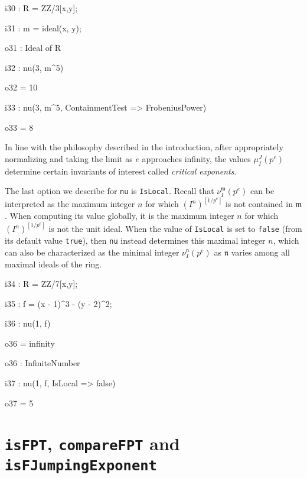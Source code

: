 \documentclass{amsart}
\newcommand{\idealm}{\mathfrak{m}}
\begin{document}
\bigskip
{\small
{}
\begin{MyVerbatim}
i30 : R = ZZ/3[x,y];

i31 : m = ideal(x, y);

o31 : Ideal of R

i32 : nu(3, m^5)

o32 = 10

i33 : nu(3, m^5, ContainmentTest => FrobeniusPower)

o33 = 8
\end{MyVerbatim}
}
\bigskip

 In line with the philosophy described in the introduction, after appropriately normalizing and taking the limit as $e$ approaches infinity, the values $\mu_I^J(p^e)$ determine certain invariants of interest called \emph{critical exponents}.

The last option we describe for \texttt{nu} is \texttt{IsLocal}.
Recall that $\nu_I^\idealm(p^e)$ can be interpreted as the maximum integer $n$ for which $(I^n)^{[1/p^e]}$ is not contained in $\idealm$. 
When computing its value globally, it is the maximum integer $n$ for which $(I^n)^{[1/p^e]}$ is not the unit ideal.  When 
the value of \texttt{IsLocal} is set to \texttt{false} (from its default value \texttt{true}), then \texttt{nu} instead determines this maximal integer $n$, which can also be characterized as the minimal integer $\nu_I^\mathfrak{n}(p^e)$ as $\mathfrak{n}$ varies among all maximal ideals of the ring.  

%

\bigskip
{\small
{}
\begin{MyVerbatim}
i34 : R = ZZ/7[x,y];

i35 : f = (x - 1)^3 - (y - 2)^2;

i36 : nu(1, f)

o36 = infinity

o36 : InfiniteNumber

i37 : nu(1, f, IsLocal => false)

o37 = 5
\end{MyVerbatim}
}


\section{{\tt isFPT}, {\tt compareFPT} and {\tt isFJumpingExponent}}
\label{sec.IsFPT}
\end{document}
